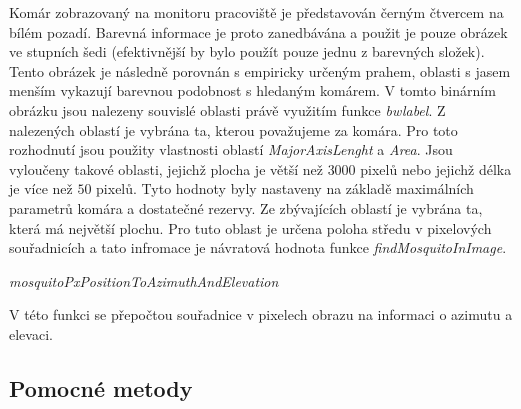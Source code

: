 \documentclass[a4paper,10pt]{article}
\begin{document}

		Komár zobrazovaný na monitoru pracoviště je představován černým čtvercem na
		bílém pozadí. Barevná informace je proto zanedbávána a použit je pouze obrázek
		ve stupních šedi (efektivnější by bylo použít pouze jednu z barevných složek).
		Tento obrázek je následně porovnán s empiricky určeným prahem, oblasti s jasem
		menším vykazují barevnou podobnost s hledaným komárem. V tomto binárním obrázku
		jsou nalezeny souvislé oblasti právě využitím funkce \textit{bwlabel}. Z
		nalezených oblastí je vybrána ta, kterou považujeme za komára. Pro toto
		rozhodnutí jsou použity vlastnosti oblastí \textit{MajorAxisLenght} a
		\textit{Area}. Jsou vyloučeny takové oblasti, jejichž plocha je větší než $3000$
		pixelů nebo jejichž délka je více než $50$ pixelů. Tyto hodnoty byly nastaveny
		na základě maximálních parametrů komára a dostatečné rezervy. Ze zbývajících
		oblastí je vybrána ta, která má největší plochu. Pro tuto oblast je určena
		poloha středu v pixelových souřadnicích a tato infromace je návratová hodnota
		funkce \textit{findMosquitoInImage}.


\vspace{0.5cm}
\textit{mosquitoPxPositionToAzimuthAndElevation}

		V této funkci se přepočtou souřadnice v pixelech obrazu na informaci o azimutu a
		elevaci.


\subsection{Pomocné metody}
\end{document}
